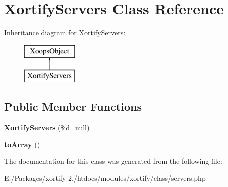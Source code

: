 \hypertarget{class_xortify_servers}{\section{Xortify\-Servers Class Reference}
\label{class_xortify_servers}
}
Inheritance diagram for Xortify\-Servers\-:\begin{figure}[H]
\begin{center}
\leavevmode
\includegraphics[height=2.000000cm]{class_xortify_servers}
\end{center}
\end{figure}
\subsection*{Public Member Functions}
\begin{DoxyCompactItemize}
\item 
\hypertarget{class_xortify_servers_a178e938b1b613c306495fef0bb20993d}{{\bfseries Xortify\-Servers} (\$id=null)}\label{class_xortify_servers_a178e938b1b613c306495fef0bb20993d}

\item 
\hypertarget{class_xortify_servers_aff40f0ae8b916f4ddb76e2b729b4e78f}{{\bfseries to\-Array} ()}\label{class_xortify_servers_aff40f0ae8b916f4ddb76e2b729b4e78f}

\end{DoxyCompactItemize}


The documentation for this class was generated from the following file\-:\begin{DoxyCompactItemize}
\item 
E\-:/\-Packages/xortify 2./htdocs/modules/xortify/class/servers.\-php\end{DoxyCompactItemize}
